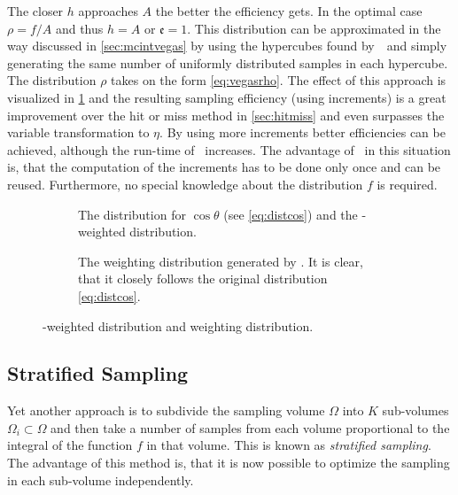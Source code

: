 The closer \(h\) approaches \(A\) the better the efficiency gets. In
the optimal case \(\rho=f/A\) and thus \(h=A\) or
\(\mathfrak{e} = 1\). This distribution can be approximated in the way
discussed in \cref{sec:mcintvegas} by using the hypercubes found
by~\vegas\ and simply generating the same number of uniformly
distributed samples in each hypercube. The distribution \(\rho\) takes
on the form \cref{eq:vegasrho}. The effect of this approach is
visualized in \cref{fig:vegasdist} and the resulting sampling
efficiency  (using
 increments) is a great
improvement over the hit or miss method in \cref{sec:hitmiss} and even
surpasses the variable transformation to \(\eta\). By using more
increments better efficiencies can be achieved, although the run-time
of \vegas\ increases. The advantage of \vegas\ in this situation is,
that the computation of the increments has to be done only once and
can be reused. Furthermore, no special knowledge about the
distribution \(f\) is required.

\begin{figure}[ht]
  \centering
  \begin{subfigure}{.49\textwidth}
    \caption[The distribution for \(\cos\theta\), derived from the
    differential cross-section and the \vegas-weighted
    distribution]{\label{fig:vegasdist} The distribution for
      \(\cos\theta\) (see \cref{eq:distcos}) and the \vegas-weighted
      distribution.}
  \end{subfigure}
  \begin{subfigure}{.49\textwidth}
    \caption[The weighting distribution generated by
    \vegas.]{\label{fig:vegasrho} The weighting distribution generated
      by \vegas. It is clear, that it closely follows the original
      distribution \cref{eq:distcos}.}
  \end{subfigure}
  \caption{\label{fig:vegas-weighting} \vegas-weighted distribution
    and weighting distribution.}
\end{figure}



\subsection{Stratified Sampling}
\label{sec:stratsamp-real}

Yet another approach is to subdivide the sampling volume \(\Omega\)
into \(K\) sub-volumes \(\Omega_i\subset\Omega\) and then take a
number of samples from each volume proportional to the integral of the
function \(f\) in that volume. This is known as \emph{stratified
  sampling}. The advantage of this method is, that it is now possible
to optimize the sampling in each sub-volume independently.

